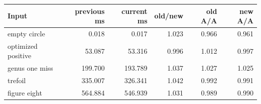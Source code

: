 \begin{center}
\small
\begin{tabular}{lrrrrr}
\toprule
Input & previous ms & current ms & old/new & old A/A & new A/A\\
\midrule
empty circle & 0.018 & 0.017 & 1.023 & 0.966 & 0.961\\
optimized positive & 53.087 & 53.316 & 0.996 & 1.012 & 0.997\\
genus one miss & 199.700 & 193.789 & 1.037 & 1.027 & 1.025\\
trefoil & 335.007 & 326.341 & 1.042 & 0.992 & 0.991\\
figure eight & 564.884 & 546.939 & 1.031 & 0.989 & 0.990\\
\bottomrule
\end{tabular}
\end{center}
